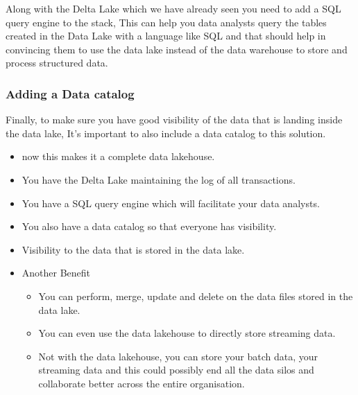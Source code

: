 Along with the Delta Lake which we have already seen you need to add a SQL query engine to the stack,
This can help you data analysts query the tables created in the Data Lake with a language like SQL and that should help in convincing them to use the data lake instead of the data warehouse to store and process structured data.

\subsubsection{Adding a Data catalog}
Finally, to make sure you have good visibility of the data that is landing inside the data lake, It's important to also include a data catalog to this solution.
\begin{itemize}
    \item now this makes it a complete data lakehouse.
    \item You have the Delta Lake maintaining the log of all transactions.
    \item You have a SQL query engine which will facilitate your data analysts.
    \item You also have a data catalog so that everyone has visibility.
    \item Visibility to the data that is stored in the data lake.
    \item Another Benefit \begin{itemize}
                              \item You can perform, merge, update and delete on the data files stored in the data lake.
                              \item You can even use the data lakehouse to directly store streaming data.
                              \item Not with the data lakehouse, you can store your batch data, your streaming data and this could possibly end all the data silos and collaborate better across the entire organisation.
    \end{itemize}
\end{itemize}

